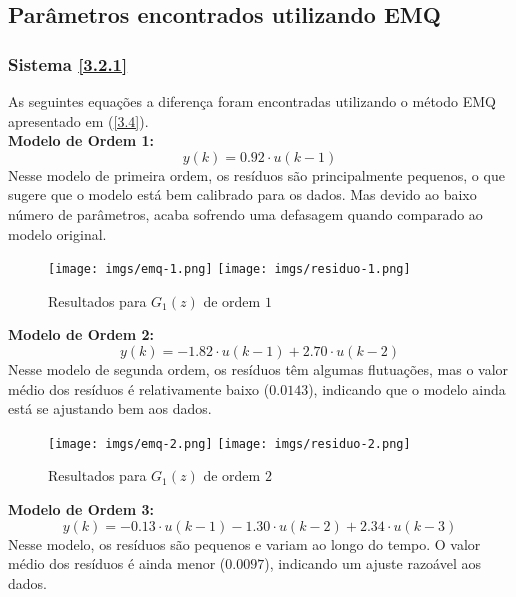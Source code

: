\documentclass[a4paper,12pt]{article}
\begin{document}
\subsection{Parâmetros encontrados utilizando EMQ}\label{4.4}

\subsubsection{Sistema \ref{3.2.1}}
As seguintes equações a diferença foram encontradas utilizando o método EMQ apresentado em (\ref{3.4}).\\

\noindent \textbf{Modelo de Ordem 1:}
\begin{equation*}
    y(k) = 0.92 \cdot u(k-1)\tag{4.4.1.1}
\end{equation*}
Nesse modelo de primeira ordem, os resíduos são principalmente pequenos, o que sugere que o modelo está bem calibrado para os dados. Mas devido ao baixo número de parâmetros, acaba sofrendo uma defasagem quando comparado ao modelo original.

\begin{figure}[h!]
\begin{center}
	\texttt{[image: imgs/emq-1.png]} \quad
	\texttt{[image: imgs/residuo-1.png]}
\caption{Resultados para $G_1(z)$ de ordem $1$} \label{fig6}
\end{center}
\end{figure}

\noindent \textbf{Modelo de Ordem 2:}
\begin{equation*}
    y(k) = -1.82 \cdot u(k-1) + 2.70 \cdot u(k-2)\tag{4.4.1.2}
\end{equation*}
Nesse modelo de segunda ordem, os resíduos têm algumas flutuações, mas o valor médio dos resíduos é relativamente baixo ($0.0143$), indicando que o modelo ainda está se ajustando bem aos dados.

\begin{figure}[h!]
\begin{center}
	\texttt{[image: imgs/emq-2.png]} \quad
	\texttt{[image: imgs/residuo-2.png]}
\caption{Resultados para $G_1(z)$ de ordem $2$} \label{fig7}
\end{center}
\end{figure}

\newpage
\noindent \textbf{Modelo de Ordem 3:}
\begin{equation*}
y(k) = -0.13 \cdot u(k-1) - 1.30 \cdot u(k-2) + 2.34 \cdot u(k-3)\tag{4.4.1.3}
\end{equation*}
Nesse modelo, os resíduos são pequenos e variam ao longo do tempo. O valor médio dos resíduos é ainda menor ($0.0097$), indicando um ajuste razoável aos dados.
\end{document}
